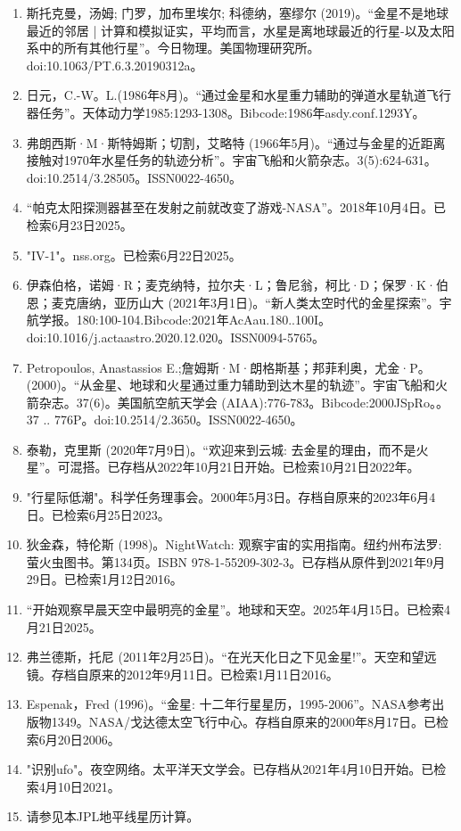 \begin{enumerate}
\item 斯托克曼，汤姆; 门罗，加布里埃尔; 科德纳，塞缪尔 (2019)。“金星不是地球最近的邻居 | 计算和模拟证实，平均而言，水星是离地球最近的行星-以及太阳系中的所有其他行星”。今日物理。美国物理研究所。doi:10.1063/PT.6.3.20190312a。
\item 日元，C.-W。L.(1986年8月)。“通过金星和水星重力辅助的弹道水星轨道飞行器任务”。天体动力学1985:1293-1308。Bibcode:1986年asdy.conf.1293Y。
\item 弗朗西斯·M·斯特姆斯；切割，艾略特 (1966年5月)。“通过与金星的近距离接触对1970年水星任务的轨迹分析”。宇宙飞船和火箭杂志。3(5):624-631。doi:10.2514/3.28505。ISSN0022-4650。 
\item “帕克太阳探测器甚至在发射之前就改变了游戏-NASA”。2018年10月4日。已检索6月23日2025。
\item "IV-1"。nss.org。已检索6月22日2025。
\item 伊森伯格，诺姆·R；麦克纳特，拉尔夫·L；鲁尼翁，柯比·D；保罗·K·伯恩；麦克唐纳，亚历山大 (2021年3月1日)。“新人类太空时代的金星探索”。宇航学报。180:100-104.Bibcode:2021年AcAau.180..100I。doi:10.1016/j.actaastro.2020.12.020。ISSN0094-5765。 
\item Petropoulos, Anastassios E.;詹姆斯·M·朗格斯基；邦菲利奥，尤金·P。(2000)。“从金星、地球和火星通过重力辅助到达木星的轨迹”。宇宙飞船和火箭杂志。37(6)。美国航空航天学会 (AIAA):776-783。Bibcode:2000JSpRo。。37 .. 776P。doi:10.2514/2.3650。ISSN0022-4650。 
\item 泰勒，克里斯 (2020年7月9日)。“欢迎来到云城: 去金星的理由，而不是火星”。可混搭。已存档从2022年10月21日开始。已检索10月21日2022年。
\item "行星际低潮"。科学任务理事会。2000年5月3日。存档自原来的2023年6月4日。已检索6月25日2023。
\item 狄金森，特伦斯 (1998)。NightWatch: 观察宇宙的实用指南。纽约州布法罗: 萤火虫图书。第134页。ISBN 978-1-55209-302-3。已存档从原件到2021年9月29日。已检索1月12日2016。
\item “开始观察早晨天空中最明亮的金星”。地球和天空。2025年4月15日。已检索4月21日2025。
\item 弗兰德斯，托尼 (2011年2月25日)。“在光天化日之下见金星!”。天空和望远镜。存档自原来的2012年9月11日。已检索1月11日2016。
\item Espenak，Fred (1996)。“金星: 十二年行星星历，1995-2006”。NASA参考出版物1349。NASA/戈达德太空飞行中心。存档自原来的2000年8月17日。已检索6月20日2006。
\item "识别ufo"。夜空网络。太平洋天文学会。已存档从2021年4月10日开始。已检索4月10日2021。
\item 请参见本JPL地平线星历计算。

\end{enumerate}
